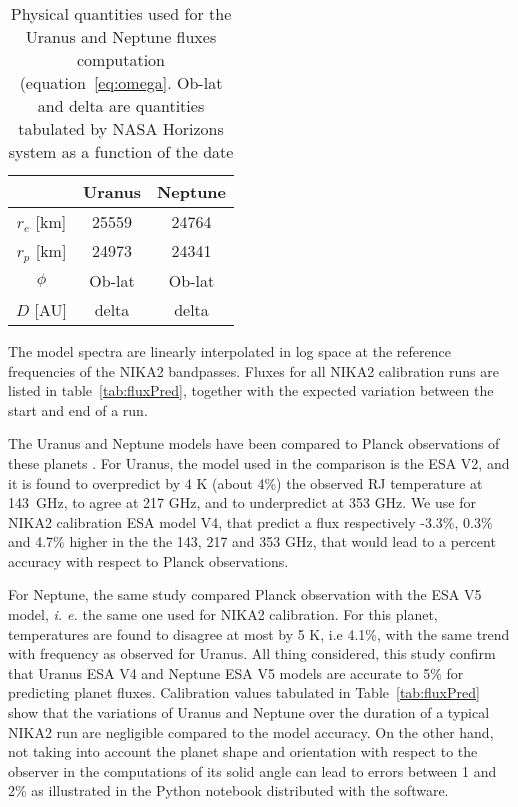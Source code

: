 \begin{table}[ht]
\begin{center}
\begin{tabular}{|c|c|c|}
\hline
     & Uranus & Neptune \\
\hline
$r_{e}$ [km]  & 25559 & 24764 \\ 
\hline
$r_{p}$ [km]  & 24973 & 24341  \\
\hline
$\phi$         & Ob-lat & Ob-lat \\
\hline
$D$   [AU]    & delta   & delta \\
\hline
\end{tabular}
\end{center}
\caption[Primary calibrator flux models]{Physical quantities used for the Uranus and Neptune fluxes
  computation (equation~\ref{eq:omega}. Ob-lat and delta are quantities 
  tabulated by NASA Horizons system \cite{NASAHorizon} as a function of the date}
\label{tab:planetphysparam}
\end{table}


The model spectra are linearly interpolated in log space at the
reference frequencies of the NIKA2 bandpasses. Fluxes for all NIKA2
calibration runs are listed in table~\ref{tab:fluxPred}, together with
the expected variation between the start and end of a run. 

The Uranus and Neptune models have been compared to Planck
observations of these planets \cite{PLCK-LII}. For Uranus, the model used in the comparison
is the ESA V2, and it is found to overpredict by 4 K (about 4\%) the
observed RJ temperature at 143~GHz, to agree at 217 GHz, and
to underpredict at 353 GHz. We use for NIKA2 calibration ESA model V4,
that predict a flux respectively -3.3\%, 0.3\% and 4.7\% higher in the
the 143, 217 and 353 GHz, that would lead to a percent
accuracy with respect to Planck observations. 

For Neptune, the same study compared Planck observation with the ESA V5
model, {\it i. e.} the same one used for NIKA2 calibration. For this
planet, temperatures are found to disagree at most by 5 K, i.e 4.1\%,
with the same trend with frequency as observed for Uranus. All thing
considered, this study confirm that Uranus ESA V4 and Neptune ESA V5
models are accurate to 5\% for predicting planet fluxes. Calibration
values tabulated in Table~\ref{tab:fluxPred} show that the variations
of Uranus and Neptune over the duration of a typical NIKA2 run are
negligible compared to the model accuracy. On the other hand, not
taking into account the planet shape and orientation with respect to
the observer in the computations of its solid angle can lead to errors
between 1 and 2\% as illustrated in the Python notebook
\cite{gith-Haussel-Note}
distributed with the software. 



